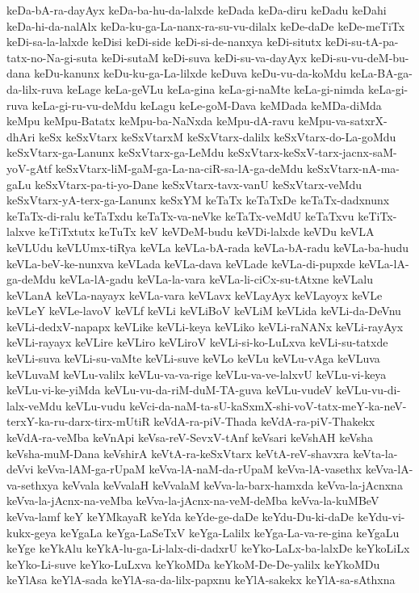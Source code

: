 {keDa-bA-ra-dayAyx
keDa-ba-hu-da-lalxde
keDada
keDa-diru
keDadu
keDahi
keDa-hi-da-nalAlx
keDa-ku-ga-La-nanx-ra-su-vu-dilalx
keDe-daDe
keDe-meTiTx
keDi-sa-la-lalxde
keDisi
keDi-side
keDi-si-de-nanxya
keDi-situtx
keDi-su-tA-pa-tatx-no-Na-gi-suta
keDi-sutaM
keDi-suva
keDi-su-va-dayAyx
keDi-su-vu-deM-bu-dana
keDu-kanunx
keDu-ku-ga-La-lilxde
keDuva
keDu-vu-da-koMdu
keLa-BA-ga-da-lilx-ruva
keLage
keLa-geVLu
keLa-gina
keLa-gi-naMte
keLa-gi-nimda
keLa-gi-ruva
keLa-gi-ru-vu-deMdu
keLagu
keLe-goM-Dava
keMDada
keMDa-diMda
keMpu
keMpu-Batatx
keMpu-ba-NaNxda
keMpu-dA-ravu
keMpu-va-satxrX-dhAri
keSx
keSxVtarx
keSxVtarxM
keSxVtarx-dalilx
keSxVtarx-do-La-goMdu
keSxVtarx-ga-Lanunx
keSxVtarx-ga-LeMdu
keSxVtarx-keSxV-tarx-jacnx-saM-yoV-gAtf
keSxVtarx-liM-gaM-ga-La-na-ciR-sa-lA-ga-deMdu
keSxVtarx-nA-ma-gaLu
keSxVtarx-pa-ti-yo-Dane
keSxVtarx-tavx-vanU
keSxVtarx-veMdu
keSxVtarx-yA-terx-ga-Lanunx
keSxYM
keTaTx
keTaTxDe
keTaTx-dadxnunx
keTaTx-di-ralu
keTaTxdu
keTaTx-va-neVke
keTaTx-veMdU
keTaTxvu
keTiTx-lalxve
keTiTxtutx
keTuTx
keV
keVDeM-budu
keVDi-lalxde
keVDu
keVLA
keVLUdu
keVLUmx-tiRya
keVLa
keVLa-bA-rada
keVLa-bA-radu
keVLa-ba-hudu
keVLa-beV-ke-nunxva
keVLada
keVLa-dava
keVLade
keVLa-di-pupxde
keVLa-lA-ga-deMdu
keVLa-lA-gadu
keVLa-la-vara
keVLa-li-ciCx-su-tAtxne
keVLalu
keVLanA
keVLa-nayayx
keVLa-vara
keVLavx
keVLayAyx
keVLayoyx
keVLe
keVLeY
keVLe-lavoV
keVLf
keVLi
keVLiBoV
keVLiM
keVLida
keVLi-da-DeVnu
keVLi-dedxV-napapx
keVLike
keVLi-keya
keVLiko
keVLi-raNANx
keVLi-rayAyx
keVLi-rayayx
keVLire
keVLiro
keVLiroV
keVLi-si-ko-LuLxva
keVLi-su-tatxde
keVLi-suva
keVLi-su-vaMte
keVLi-suve
keVLo
keVLu
keVLu-vAga
keVLuva
keVLuvaM
keVLu-valilx
keVLu-va-va-rige
keVLu-va-ve-lalxvU
keVLu-vi-keya
keVLu-vi-ke-yiMda
keVLu-vu-da-riM-duM-TA-guva
keVLu-vudeV
keVLu-vu-di-lalx-veMdu
keVLu-vudu
keVci-da-naM-ta-sU-kaSxmX-shi-voV-tatx-meY-ka-neV-terxY-ka-ru-darx-tirx-mUtiR
keVdA-ra-piV-Thada
keVdA-ra-piV-Thakekx
keVdA-ra-veMba
keVnApi
keVsa-reV-SevxV-tAnf
keVsari
keVshAH
keVsha
keVsha-muM-Dana
keVshirA
keVtA-ra-keSxVtarx
keVtA-reV-shavxra
keVta-la-deVvi
keVva-lAM-ga-rUpaM
keVva-lA-naM-da-rUpaM
keVva-lA-vasethx
keVva-lA-va-sethxya
keVvala
keVvalaH
keVvalaM
keVva-la-barx-hamxda
keVva-la-jAcnxna
keVva-la-jAcnx-na-veMba
keVva-la-jAcnx-na-veM-deMba
keVva-la-kuMBeV
keVva-lamf
keY
keYMkayaR
keYda
keYde-ge-daDe
keYdu-Du-ki-daDe
keYdu-vi-kukx-geya
keYgaLa
keYga-LaSeTxV
keYga-Lalilx
keYga-La-va-re-gina
keYgaLu
keYge
keYkAlu
keYkA-lu-ga-Li-lalx-di-dadxrU
keYko-LaLx-ba-lalxDe
keYkoLiLx
keYko-Li-suve
keYko-LuLxva
keYkoMDa
keYkoM-De-De-yalilx
keYkoMDu
keYlAsa
keYlA-sada
keYlA-sa-da-lilx-papxnu
keYlA-sakekx
keYlA-sa-sAthxna
}
